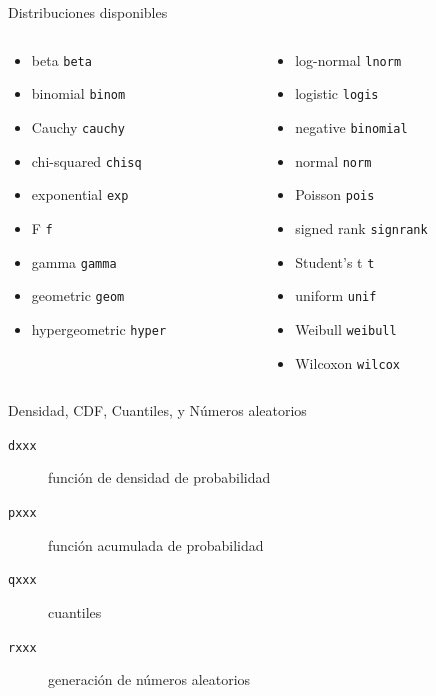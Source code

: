\documentclass[xcolor={usenames,svgnames,dvipsnames}]{beamer}
\begin{document}
\begin{frame}[fragile,label=sec-3-1]{Distribuciones disponibles}
 \begin{columns}
\begin{column}{.5\textwidth}
\begin{itemize}
\item beta \texttt{beta}
\item binomial \texttt{binom}
\item Cauchy \texttt{cauchy}
\item chi-squared \texttt{chisq}
\item exponential \texttt{exp}
\item F \texttt{f}
\item gamma \texttt{gamma}
\item geometric \texttt{geom}
\item hypergeometric \texttt{hyper}
\end{itemize}
\end{column}
\begin{column}{.5\textwidth}
\begin{itemize}
\item log-normal \texttt{lnorm}
\item logistic \texttt{logis}
\item negative \texttt{binomial}
\item normal \texttt{norm}
\item Poisson \texttt{pois}
\item signed rank \texttt{signrank}
\item Student’s t \texttt{t}
\item uniform \texttt{unif}
\item Weibull \texttt{weibull}
\item Wilcoxon \texttt{wilcox}
\end{itemize}
\end{column}
\end{columns}
\end{frame}

\begin{frame}[fragile,label=sec-3-2]{Densidad, CDF, Cuantiles, y Números aleatorios}
 \begin{description}
\item[{\texttt{dxxx}}] función de densidad de probabilidad
\item[{\texttt{pxxx}}] función acumulada de probabilidad
\item[{\texttt{qxxx}}] cuantiles
\item[{\texttt{rxxx}}] generación de números aleatorios
\end{description}
\end{frame}
\end{document}
